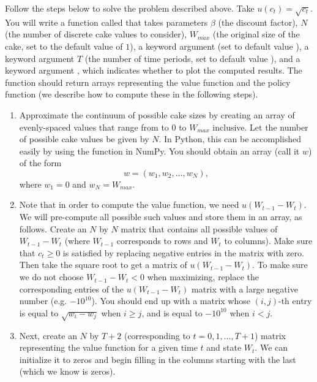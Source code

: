 \begin{problem}
\label{prob:cake_prob}
Follow the steps below to solve the problem described above.  Take $u(c_t) = \sqrt{c_t}$.
You will write a function called  that takes parameters $\beta$ (the discount factor),
$N$ (the number of discrete cake values to consider), $W_{max}$ (the original size of the cake,
set to the default value of $1$), a keyword argument  (set to default value ),
a keyword argument  $T$ (the number of time periods, set to
default value ), and a keyword argument , which indicates whether
to plot the computed results. The function should return arrays representing the value function and the
policy function (we describe how to compute these in the following steps).
\begin{enumerate}
\item Approximate the continuum of possible cake sizes by creating an array
of evenly-spaced values that range from to 0 to $W_{max}$ inclusive.
Let the number of possible cake values be given by $N$. In Python, this can be accomplished easily by
using the  function in NumPy. You should obtain an array (call it $w$) of the form
\[
w = (w_1, w_2, \ldots, w_N),
\]
where $w_1 = 0$ and $w_N = W_{max}$.

\item Note that in order to compute the value function, we need $u(W_{t-1}-W_t)$.
We will pre-compute all possible such values and store them in an array, as follows.
Create an $N$ by $N$ matrix that contains
all possible values of $W_{t-1} - W_t$ (where $W_{t-1}$ corresponds to rows and $W_{t}$ to columns).  Make sure that
$c_t \geq 0$ is satisfied by replacing negative entries in the matrix with zero.  Then take the square root to get a matrix
of $u(W_{t-1}-W_t)$.  To make sure we do not choose $W_{t-1} - W_t < 0$ when maximizing, replace the corresponding entries of
the $u(W_{t-1}-W_t)$ matrix with a large negative number (e.g. $-10^{10}$). You should end up with a matrix whose
$(i,j)$-th entry is equal to $\sqrt{w_i - w_j}$ when $i \geq j$, and is equal to $-10^{10}$ when $i < j$.

\item Next, create an $N$ by $T+2$ (corresponding to $t=0,1,\ldots, T+1$) matrix representing the value function for a given
time $t$ and state $W_t$.  We can initialize it to zeros and begin filling in the columns starting with the last (which we
know is zeros).


\end{enumerate}
\end{problem}
